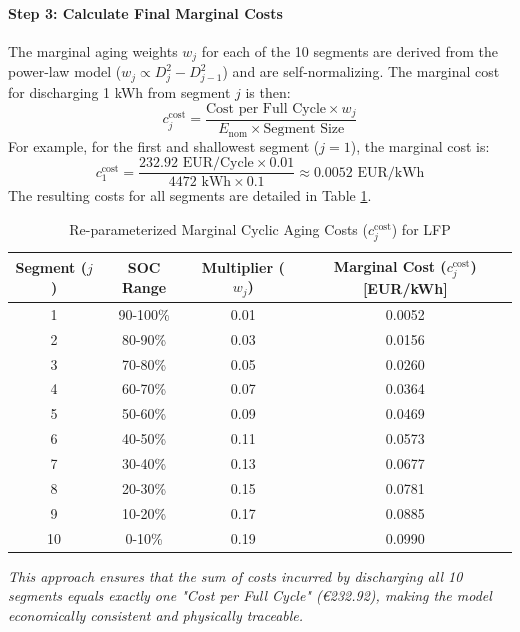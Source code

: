 \documentclass[11pt, a4paper]{article}
\begin{document}
\paragraph{Step 3: Calculate Final Marginal Costs}
The marginal aging weights $w_j$ for each of the 10 segments are derived from the power-law model ($w_j \propto D_j^2 - D_{j-1}^2$) and are self-normalizing. The marginal cost for discharging 1 kWh from segment $j$ is then:
\begin{equation*}
c^{\mathrm{cost}}_{j} = \frac{\text{Cost per Full Cycle} \times w_j}{E_{\mathrm{nom}} \times \text{Segment Size}}
\end{equation*}
For example, for the first and shallowest segment ($j=1$), the marginal cost is:
\begin{equation*}
c^{\mathrm{cost}}_{1} = \frac{232.92 \text{ EUR/Cycle} \times 0.01}{4472 \text{ kWh} \times 0.1} \approx 0.0052 \text{ EUR/kWh}
\end{equation*}
The resulting costs for all segments are detailed in Table \ref{tab:marginal_costs}.

\begin{table}[h!]
\centering
\caption{Re-parameterized Marginal Cyclic Aging Costs ($c^{\mathrm{cost}}_{j}$) for LFP}
\label{tab:marginal_costs}
\begin{tabular}{@{}cccc@{}}
\toprule
\textbf{Segment ($j$)} & \textbf{SOC Range} & \textbf{Multiplier ($w_j$)} & \textbf{Marginal Cost ($c^{\mathrm{cost}}_{j}$) [EUR/kWh]} \\ \midrule
1 & 90-100\% & 0.01 & 0.0052 \\
2 & 80-90\% & 0.03 & 0.0156 \\
3 & 70-80\% & 0.05 & 0.0260 \\
4 & 60-70\% & 0.07 & 0.0364 \\
5 & 50-60\% & 0.09 & 0.0469 \\
6 & 40-50\% & 0.11 & 0.0573 \\
7 & 30-40\% & 0.13 & 0.0677 \\
8 & 20-30\% & 0.15 & 0.0781 \\
9 & 10-20\% & 0.17 & 0.0885 \\
10 & 0-10\% & 0.19 & 0.0990 \\ \bottomrule
\end{tabular}
\end{table}
\textit{This approach ensures that the sum of costs incurred by discharging all 10 segments equals exactly one "Cost per Full Cycle" (€232.92), making the model economically consistent and physically traceable.}
\end{document}

